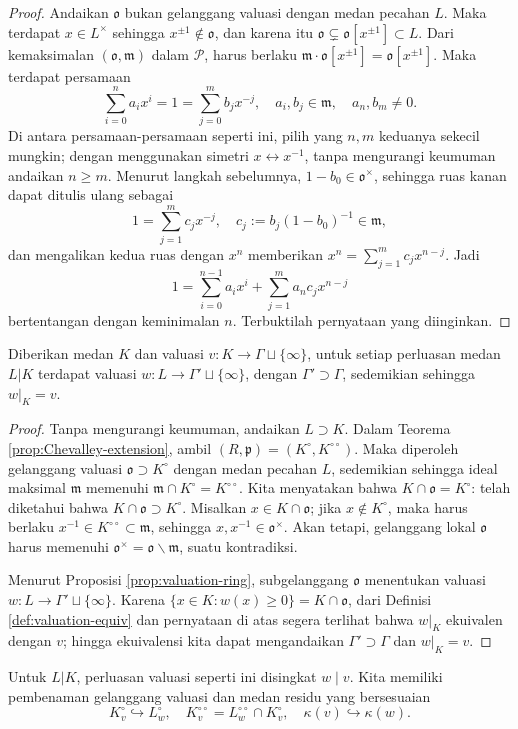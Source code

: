 \begin{proof}
	Andaikan $\mathfrak{o}$ bukan gelanggang valuasi dengan medan pecahan $L$. Maka terdapat $x \in L^\times$ sehingga $x^{\pm 1} \notin \mathfrak{o}$, dan karena itu $\mathfrak{o} \subsetneq \mathfrak{o}[x^{\pm 1}] \subset L$. Dari kemaksimalan $(\mathfrak{o}, \mathfrak{m})$ dalam $\mathcal{P}$, harus berlaku $\mathfrak{m} \cdot \mathfrak{o}[x^{\pm 1}] = \mathfrak{o}[x^{\pm 1}]$. Maka terdapat persamaan
	\[ \sum_{i=0}^n a_i x^i= 1 = \sum_{j=0}^m b_j x^{-j}, \quad a_i, b_j \in \mathfrak{m}, \quad a_n, b_m \neq 0. \]
	Di antara persamaan-persamaan seperti ini, pilih yang $n, m$ keduanya sekecil mungkin; dengan menggunakan simetri $x \leftrightarrow x^{-1}$, tanpa mengurangi keumuman andaikan $n \geq m$. Menurut langkah sebelumnya, $1-b_0 \in \mathfrak{o}^\times$, sehingga ruas kanan dapat ditulis ulang sebagai
	\[ 1 = \sum_{j=1}^m c_j x^{-j}, \quad c_j := b_j (1-b_0)^{-1} \in \mathfrak{m}, \]
	dan mengalikan kedua ruas dengan $x^n$ memberikan $x^n = \sum_{j=1}^m c_j x^{n-j}$. Jadi
	\[ 1 = \sum_{i=0}^{n-1} a_i x^i +\sum_{j=1}^m a_n c_j x^{n-j}  \]
	bertentangan dengan keminimalan $n$. Terbuktilah pernyataan yang diinginkan.
\end{proof}

\begin{theorem}\label{prop:valuation-ext}
	Diberikan medan $K$ dan valuasi $v: K \to \Gamma \sqcup \{\infty\}$, untuk setiap perluasan medan $L|K$ terdapat valuasi $w: L \to \Gamma' \sqcup \{\infty\}$, dengan $\Gamma' \supset \Gamma$, sedemikian sehingga $w|_K = v$.
\end{theorem}
\begin{proof}
	Tanpa mengurangi keumuman, andaikan $L \supset K$. Dalam Teorema \ref{prop:Chevalley-extension}, ambil $(R, \mathfrak{p}) = (K^\circ, K^{\circ\circ})$. Maka diperoleh gelanggang valuasi $\mathfrak{o} \supset K^\circ$ dengan medan pecahan $L$, sedemikian sehingga ideal maksimal $\mathfrak{m}$ memenuhi $\mathfrak{m} \cap K^\circ = K^{\circ\circ}$. Kita menyatakan bahwa $K \cap \mathfrak{o} = K^\circ$: telah diketahui bahwa $K \cap \mathfrak{o} \supset K^\circ$. Misalkan $x \in K \cap \mathfrak{o}$; jika $x \notin K^\circ$, maka harus berlaku $x^{-1} \in K^{\circ\circ} \subset \mathfrak{m}$, sehingga $x, x^{-1} \in \mathfrak{o}^\times$. Akan tetapi, gelanggang lokal $\mathfrak{o}$ harus memenuhi $\mathfrak{o}^\times = \mathfrak{o} \smallsetminus \mathfrak{m}$, suatu kontradiksi.

	Menurut Proposisi \ref{prop:valuation-ring}, subgelanggang $\mathfrak{o}$ menentukan valuasi $w: L \to \Gamma' \sqcup \{\infty\}$. Karena $\{x \in K: w(x) \geq 0 \} = K \cap \mathfrak{o}$, dari Definisi \ref{def:valuation-equiv} dan pernyataan di atas segera terlihat bahwa $w|_K$ ekuivalen dengan $v$; hingga ekuivalensi kita dapat mengandaikan $\Gamma' \supset \Gamma$ dan $w|_K = v$.
\end{proof}
Untuk $L|K$, perluasan valuasi seperti ini disingkat $w \mid v$. Kita memiliki pembenaman gelanggang valuasi dan medan residu yang bersesuaian
\[ K^\circ_v \hookrightarrow L^\circ_w, \quad K^{\circ\circ}_v = L^{\circ\circ}_w \cap K^\circ_v, \quad \kappa(v) \hookrightarrow \kappa(w). \]

